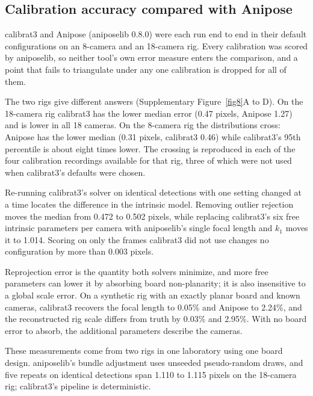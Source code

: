 
\subsection{Calibration accuracy compared with Anipose}\label{subsec-calib}

calibrat3 and Anipose (aniposelib 0.8.0) were each run end to end in their default configurations on an 8-camera and an 18-camera rig. Every calibration was scored by aniposelib, so neither tool's own error measure enters the comparison, and a point that fails to triangulate under any one calibration is dropped for all of them.

The two rigs give different answers (Supplementary Figure~\ref{fig8}A to D). On the 18-camera rig calibrat3 has the lower median error (0.47 pixels, Anipose 1.27) and is lower in all 18 cameras. On the 8-camera rig the distributions cross: Anipose has the lower median (0.31 pixels, calibrat3 0.46) while calibrat3's 95th percentile is about eight times lower. The crossing is reproduced in each of the four calibration recordings available for that rig, three of which were not used when calibrat3's defaults were chosen.

Re-running calibrat3's solver on identical detections with one setting changed at a time locates the difference in the intrinsic model. Removing outlier rejection moves the median from 0.472 to 0.502 pixels, while replacing calibrat3's six free intrinsic parameters per camera with aniposelib's single focal length and $k_1$ moves it to 1.014. Scoring on only the frames calibrat3 did not use changes no configuration by more than 0.003 pixels.

Reprojection error is the quantity both solvers minimize, and more free parameters can lower it by absorbing board non-planarity; it is also insensitive to a global scale error. On a synthetic rig with an exactly planar board and known cameras, calibrat3 recovers the focal length to 0.05\% and Anipose to 2.24\%, and the reconstructed rig scale differs from truth by 0.03\% and 2.95\%. With no board error to absorb, the additional parameters describe the cameras.

These measurements come from two rigs in one laboratory using one board design. aniposelib's bundle adjustment uses unseeded pseudo-random draws, and five repeats on identical detections span 1.110 to 1.115 pixels on the 18-camera rig; calibrat3's pipeline is deterministic.
